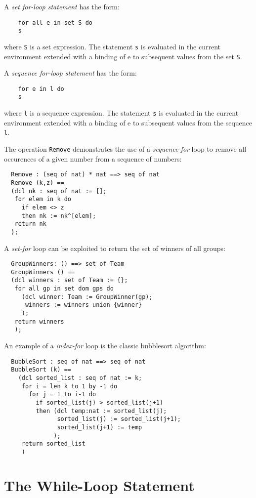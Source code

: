 \documentclass{overturerepchap}
\begin{document}
{\begin{description}
  A {\it set for-loop statement\/} has the form:
  \begin{lstlisting}
    for all e in set S do
    s
  \end{lstlisting}
  where {\tt S} is a set expression. The statement {\tt s} is evaluated in
  the current environment extended with a binding of e to subsequent values
  from the set {\tt S}.

  A {\it sequence for-loop statement\/} has the form:
  \begin{lstlisting}
    for e in l do
    s
  \end{lstlisting}
  where {\tt l} is a sequence expression. The statement {\tt s} is
  evaluated in the current environment extended with a binding of e to
  subsequent values from the sequence {\tt l}.

\item[Examples:] The operation \texttt{Remove} demonstrates the use of a
  \textit{sequence-for} loop to remove all occurences of a given number from a
  sequence of numbers:
  \begin{lstlisting}
  Remove : (seq of nat) * nat ==> seq of nat
  Remove (k,z) ==
  (dcl nk : seq of nat := [];
   for elem in k do
     if elem <> z
     then nk := nk^[elem];
   return nk
  );
  \end{lstlisting}
\label{removeDef}
  A \textit{set-for} loop can be exploited to return the set of winners of 
  all groups:
  \begin{lstlisting}
  GroupWinners: () ==> set of Team
  GroupWinners () ==
  (dcl winners : set of Team := {};
   for all gp in set dom gps do
     (dcl winner: Team := GroupWinner(gp);
      winners := winners union {winner}
     );
   return winners
   );
  \end{lstlisting}
  An example of a \textit{index-for} loop is the classic bubblesort
  algorithm:
  \begin{lstlisting}
  BubbleSort : seq of nat ==> seq of nat
  BubbleSort (k) ==
    (dcl sorted_list : seq of nat := k;
     for i = len k to 1 by -1 do
       for j = 1 to i-1 do
         if sorted_list(j) > sorted_list(j+1)
         then (dcl temp:nat := sorted_list(j);
               sorted_list(j) := sorted_list(j+1);
               sorted_list(j+1) := temp
              );
     return sorted_list
     )
\end{lstlisting}
\end{description}

\section{The While-Loop Statement}

}
\end{document}
